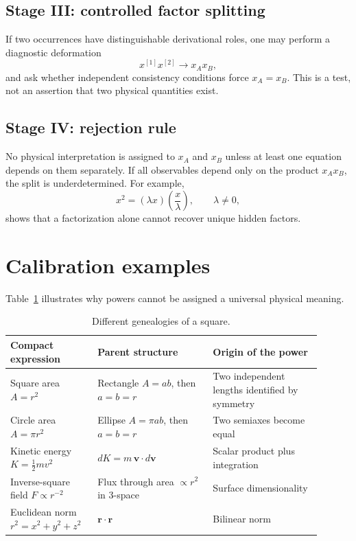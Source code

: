 \documentclass[11pt,a4paper]{article}
\begin{document}
\subsection{Stage III: controlled factor splitting}
If two occurrences have distinguishable derivational roles, one may perform a diagnostic deformation
\begin{equation}
x^{[1]}x^{[2]}\longrightarrow x_Ax_B,
\label{eq:split}
\end{equation}
and ask whether independent consistency conditions force $x_A=x_B$. This is a test, not an assertion that two physical quantities exist.

\subsection{Stage IV: rejection rule}
No physical interpretation is assigned to $x_A$ and $x_B$ unless at least one equation depends on them separately. If all observables depend only on the product $x_Ax_B$, the split is underdetermined. For example,
\begin{equation}
x^2=(\lambda x)\left(\frac{x}{\lambda}\right),\qquad \lambda\neq0,
\end{equation}
shows that a factorization alone cannot recover unique hidden factors.

\section{Calibration examples}
Table~\ref{tab:examples} illustrates why powers cannot be assigned a universal physical meaning.

\begin{table}[ht]
\centering
\caption{Different genealogies of a square.}
\label{tab:examples}
\renewcommand{\arraystretch}{1.18}
\begin{tabular}{>{\raggedright\arraybackslash}p{0.24\linewidth} >{\raggedright\arraybackslash}p{0.34\linewidth} >{\raggedright\arraybackslash}p{0.32\linewidth}}
\toprule
Compact expression & Parent structure & Origin of the power \\
\midrule
Square area $A=r^2$ & Rectangle $A=ab$, then $a=b=r$ & Two independent lengths identified by symmetry \\
Circle area $A=\pi r^2$ & Ellipse $A=\pi ab$, then $a=b=r$ & Two semiaxes become equal \\
Kinetic energy $K=\tfrac12mv^2$ & $dK=m\,\bm v\!\cdot d\bm v$ & Scalar product plus integration \\
Inverse-square field $F\propto r^{-2}$ & Flux through area $\propto r^2$ in 3-space & Surface dimensionality \\
Euclidean norm $r^2=x^2+y^2+z^2$ & $\bm r\!\cdot\bm r$ & Bilinear norm \\
\bottomrule
\end{tabular}
\end{table}
\end{document}
